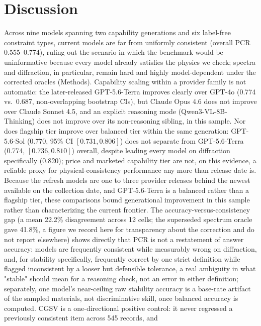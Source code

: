 \documentclass[pdflatex,sn-nature]{sn-jnl}
\begin{document}
\section*{Discussion}
Across nine models spanning two capability generations and six label-free constraint
types, current models are far from
uniformly consistent (overall PCR 0.555--0.774), ruling out the scenario in which the
benchmark would be uninformative because every model already satisfies the physics we
check; spectra and diffraction, in particular, remain hard and highly model-dependent
under the corrected oracles (Methods). Capability scaling within a provider family is not
automatic: the later-released GPT-5.6-Terra improves clearly over GPT-4o (0.774 vs.\
0.687, non-overlapping bootstrap CIs), but Claude Opus 4.6 does not improve over Claude
Sonnet 4.5, and an explicit reasoning mode (Qwen3-VL-8B-Thinking) does not improve over its
non-reasoning sibling, in this sample. Nor does flagship tier improve over balanced tier
within the same generation: GPT-5.6-Sol (0.770, 95\% CI $[0.731,0.806]$) does not separate
from GPT-5.6-Terra (0.774, $[0.736,0.810]$) overall, despite leading every model on
diffraction specifically (0.820); price and marketed capability tier are not, on this
evidence, a reliable proxy for physical-consistency performance any more than release
date is. Because the refresh models are one to three provider
releases behind the newest available on the collection date, and GPT-5.6-Terra is a
balanced rather than a flagship tier, these comparisons bound generational improvement in
this sample rather than characterizing the current frontier. The accuracy-versus-consistency gap (a mean 22.2\% disagreement across 12 cells; the
superseded spectrum oracle gave 41.8\%, a figure we record here for transparency about the
correction and do not report elsewhere) shows
directly that PCR is not a restatement of answer accuracy: models are frequently
consistent while measurably wrong on diffraction, and, for stability specifically, frequently correct
by one strict definition while flagged inconsistent by a looser but defensible
tolerance, a real ambiguity in what "stable" should mean for a reasoning check,
not an error in either definition; separately, one model's near-ceiling raw stability
accuracy is a base-rate artifact of the sampled materials, not discriminative skill, once
balanced accuracy is computed. CGSV is a one-directional positive
control: it never regressed a previously consistent item across 545 records, and
\end{document}
